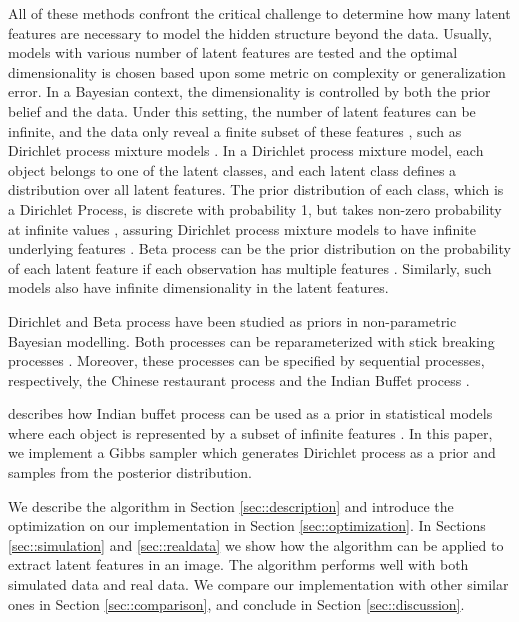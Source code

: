 \documentclass{article}
\begin{document}
All of these methods confront the critical challenge to determine how many latent features are necessary to model the hidden structure beyond the data. Usually, models with various number of latent features are tested and the optimal dimensionality is chosen based upon some metric on complexity or generalization error. In a Bayesian context, the dimensionality is controlled by both the prior belief and the data. Under this setting, the number of latent features can be infinite, and the data only reveal a finite subset of these features \citep{rasmussen2001occam}, such as Dirichlet process mixture models \citep{antoniak1974mixtures}. In a Dirichlet process mixture model, each object belongs to one of the latent classes, and each latent class defines a distribution over all latent features. The prior distribution of each class, which is a Dirichlet Process, is discrete with probability 1, but takes non-zero probability at infinite values \citep{teh2010dirichlet}, assuring Dirichlet process mixture models to have infinite underlying features \citep{rasmussen2000infinite}. Beta process can be the prior distribution on the probability of each latent feature if each observation has multiple features \citep{JMLR:v12:griffiths11a}. Similarly, such models also have infinite dimensionality in the latent features.

Dirichlet and Beta process have been studied as priors in non-parametric Bayesian modelling. Both processes can be reparameterized with stick breaking processes \citep{broderick2012beta, paisley2011stick}. Moreover, these processes can be specified by sequential processes, respectively, the Chinese restaurant process \citep{griffiths2004hierarchical} and the Indian Buffet process \citep{thibaux2007hierarchical}. 

\citet{ghahramani2006infinite} describes how Indian buffet process can be used as a prior in statistical models where each object is represented by a subset of infinite features \citep[also see][]{griffiths2005infinite}. In this paper, we implement a Gibbs sampler which generates Dirichlet process as a prior and samples from the posterior distribution. 

We describe the algorithm in Section \ref{sec::description} and introduce the optimization on our implementation in Section \ref{sec::optimization}. In Sections \ref{sec::simulation} and \ref{sec::realdata} we show how the algorithm can be applied to extract latent features in an image. The algorithm performs well with both simulated data and real data. We compare our implementation with other similar ones in Section \ref{sec::comparison}, and conclude in Section \ref{sec::discussion}. 
\end{document}
